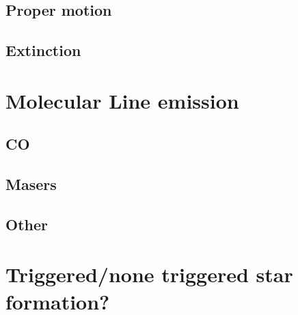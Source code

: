 \subsection{Proper motion}
\subsection{Extinction}

\section{Molecular Line emission}
\subsection{CO}
\subsection{Masers}
\subsection{Other}

\section{Triggered/none triggered star formation?}

